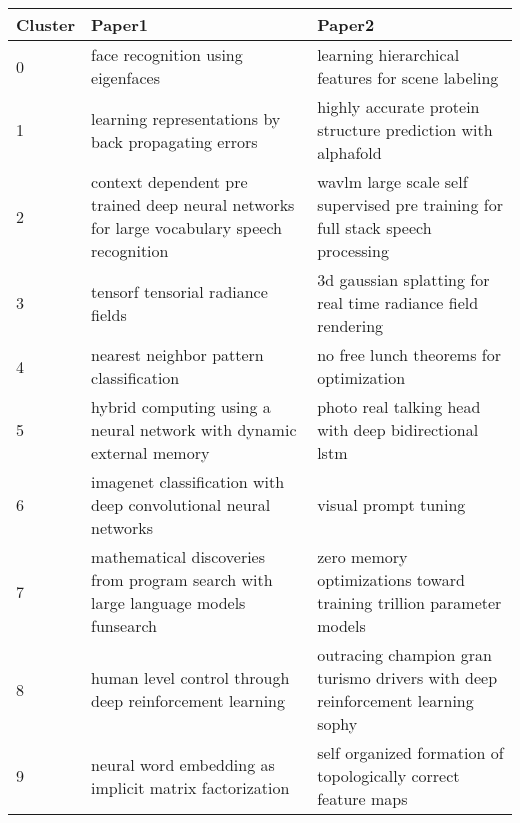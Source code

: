 \begin{tabular}{lll}
\toprule
Cluster & Paper1 & Paper2 \\
\midrule
0 & face recognition using eigenfaces & learning hierarchical features for scene labeling \\
1 & learning representations by back propagating errors & highly accurate protein structure prediction with alphafold \\
2 & context dependent pre trained deep neural networks for large vocabulary speech recognition & wavlm large scale self supervised pre training for full stack speech processing \\
3 & tensorf tensorial radiance fields & 3d gaussian splatting for real time radiance field rendering \\
4 & nearest neighbor pattern classification & no free lunch theorems for optimization \\
5 & hybrid computing using a neural network with dynamic external memory & photo real talking head with deep bidirectional lstm \\
6 & imagenet classification with deep convolutional neural networks & visual prompt tuning \\
7 & mathematical discoveries from program search with large language models funsearch & zero memory optimizations toward training trillion parameter models \\
8 & human level control through deep reinforcement learning & outracing champion gran turismo drivers with deep reinforcement learning sophy \\
9 & neural word embedding as implicit matrix factorization & self organized formation of topologically correct feature maps \\
\bottomrule
\end{tabular}
